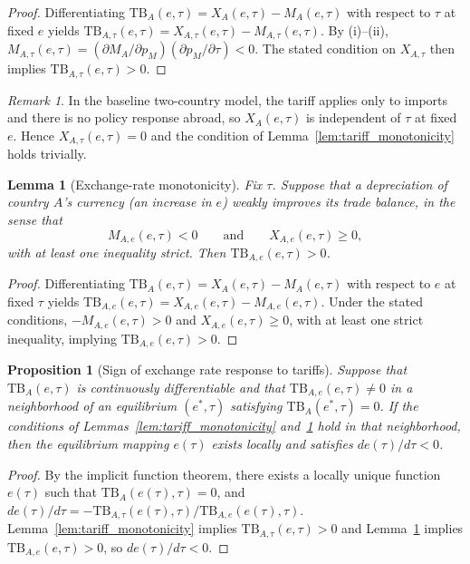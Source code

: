\documentclass[11pt]{article}
\theoremstyle{plain}
\newtheorem{lemma}{Lemma}
\newtheorem{proposition}{Proposition}
\theoremstyle{remark}
\newtheorem{remark}{Remark}
\numberwithin{lemma}{section}
\numberwithin{proposition}{section}
\numberwithin{corollary}{section}
\begin{document}
\begin{proof}
Differentiating $\mathrm{TB}_A(e,\tau) = X_A(e,\tau) - M_A(e,\tau)$ with respect to $\tau$ at fixed $e$ yields $\mathrm{TB}_{A,\tau}(e,\tau) = X_{A,\tau}(e,\tau) - M_{A,\tau}(e,\tau)$. By (i)--(ii), $M_{A,\tau}(e,\tau) = (\partial M_A/\partial p_M)(\partial p_M/\partial\tau) < 0$. The stated condition on $X_{A,\tau}$ then implies $\mathrm{TB}_{A,\tau}(e,\tau) > 0$.
\end{proof}

\begin{remark}
In the baseline two-country model, the tariff applies only to imports and there is no policy response abroad, so $X_A(e,\tau)$ is independent of $\tau$ at fixed $e$. Hence $X_{A,\tau}(e,\tau) = 0$ and the condition of Lemma~\ref{lem:tariff_monotonicity} holds trivially.
\end{remark}

\begin{lemma}[Exchange-rate monotonicity]\label{lem:er_monotonicity}
Fix $\tau$. Suppose that a depreciation of country $A$'s currency (an increase in $e$) weakly improves its trade balance, in the sense that
\[
M_{A,e}(e,\tau) < 0 \qquad \text{and} \qquad X_{A,e}(e,\tau) \ge 0,
\]
with at least one inequality strict. Then $\mathrm{TB}_{A,e}(e,\tau) > 0$.
\end{lemma}

\begin{proof}
Differentiating $\mathrm{TB}_A(e,\tau) = X_A(e,\tau) - M_A(e,\tau)$ with respect to $e$ at fixed $\tau$ yields $\mathrm{TB}_{A,e}(e,\tau) = X_{A,e}(e,\tau) - M_{A,e}(e,\tau)$. Under the stated conditions, $-M_{A,e}(e,\tau) > 0$ and $X_{A,e}(e,\tau) \ge 0$, with at least one strict inequality, implying $\mathrm{TB}_{A,e}(e,\tau) > 0$.
\end{proof}

\begin{proposition}[Sign of exchange rate response to tariffs]\label{prop:sign_de_dtau}
Suppose that $\mathrm{TB}_A(e,\tau)$ is continuously differentiable and that $\mathrm{TB}_{A,e}(e,\tau) \neq 0$ in a neighborhood of an equilibrium $(e^*,\tau)$ satisfying $\mathrm{TB}_A(e^*,\tau) = 0$. If the conditions of Lemmas~\ref{lem:tariff_monotonicity} and~\ref{lem:er_monotonicity} hold in that neighborhood, then the equilibrium mapping $e(\tau)$ exists locally and satisfies $de(\tau)/d\tau < 0$.
\end{proposition}

\begin{proof}
By the implicit function theorem, there exists a locally unique function $e(\tau)$ such that $\mathrm{TB}_A(e(\tau),\tau) = 0$, and $de(\tau)/d\tau = -\mathrm{TB}_{A,\tau}(e(\tau),\tau)/\mathrm{TB}_{A,e}(e(\tau),\tau)$. Lemma~\ref{lem:tariff_monotonicity} implies $\mathrm{TB}_{A,\tau}(e,\tau) > 0$ and Lemma~\ref{lem:er_monotonicity} implies $\mathrm{TB}_{A,e}(e,\tau) > 0$, so $de(\tau)/d\tau < 0$.
\end{proof}
\end{document}
